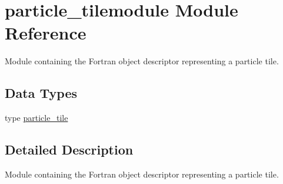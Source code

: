 \hypertarget{namespaceparticle__tilemodule}{}\section{particle\+\_\+tilemodule Module Reference}
\label{namespaceparticle__tilemodule}


Module containing the Fortran object descriptor representing a particle tile.  


\subsection*{Data Types}
\begin{DoxyCompactItemize}
\item 
type \hyperlink{structparticle__tilemodule_1_1particle__tile}{particle\+\_\+tile}
\end{DoxyCompactItemize}


\subsection{Detailed Description}
Module containing the Fortran object descriptor representing a particle tile. 
